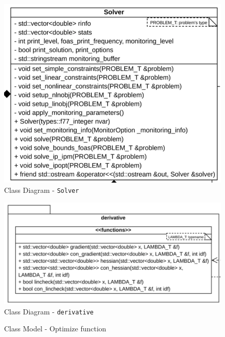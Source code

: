 \documentclass{book}
\begin{document}
\begin{figure}[!htbp]\centering
\includegraphics[width=\textwidth]{class solver.png}
\caption{Class Diagram - \tt Solver}
\end{figure}
\begin{figure}[!htbp]\centering
\includegraphics[width=\textwidth]{class derivative.png}
\caption{Class Diagram - \tt derivative}
\end{figure}
\begin{figure}[!htbp]\centering
{}
\centering
\caption{Class Model - Optimize function}
\end{figure}
\newpage
\end{document}
